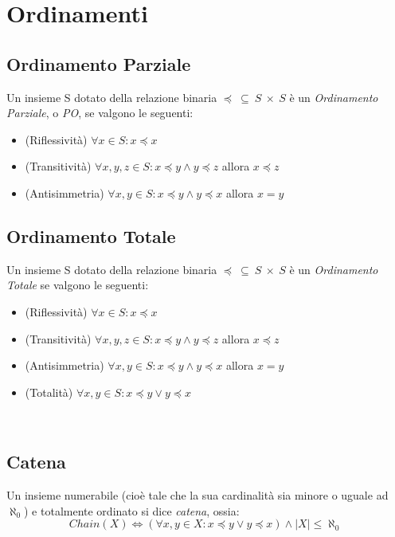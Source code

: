 \section{Ordinamenti}

\subsection{Ordinamento Parziale}

\begin{definizione}
  Un insieme S dotato della relazione binaria $\preceq\ \subseteq\ S\ \times\ S$
  è un \emph{Ordinamento Parziale}, o \emph{PO}, se valgono le seguenti:
  \begin{itemize}
  \item (Riflessività) $ \forall x \in S : x \preceq x $
  \item (Transitività) $ \forall x,y,z \in S : x \preceq y \land y \preceq z $ allora $ x \preceq z $
  \item (Antisimmetria) $ \forall x,y \in S : x \preceq y \land y \preceq x $ allora $ x = y $
  \end{itemize}
\end{definizione}

\subsection{Ordinamento Totale}
\begin{definizione}
  Un insieme S dotato della relazione binaria $\preceq\ \subseteq\ S\ \times\ S$
  è un \emph{Ordinamento Totale} se valgono le seguenti:
  \begin{itemize}
  \item (Riflessività) $ \forall x \in S : x \preceq x $
  \item (Transitività) $ \forall x,y,z \in S : x \preceq y \land y \preceq z $ allora $ x \preceq z $
  \item (Antisimmetria) $ \forall x,y \in S : x \preceq y \land y \preceq x $ allora $ x = y $
  \item (Totalità) $ \forall x,y \in S : x \preceq y \lor y \preceq x $
  \end{itemize}
\end{definizione}

\
\subsection{Catena}
\begin{definizione}[Catena]
  Un insieme numerabile (cioè tale che la sua cardinalità sia minore o uguale ad $\aleph_0 $) e totalmente ordinato si dice \emph{catena}, ossia:
  $$ Chain(X) \Longleftrightarrow (\forall x,y \in X : x \preceq y \lor y \preceq x) \land |X| \leq \aleph_0 \ $$
\end{definizione}

